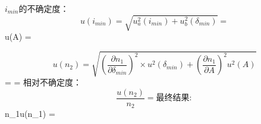${i}_{min}$的不确定度：
$$u({i}_{min}) = \sqrt{u^2_a({i}_{min})+u^2_b({\delta}_{min})} = %

$$u(A) = %

$$u(n_2) = \sqrt{(\displaystyle\frac{{\partial}n_1}{{\partial}{\delta}_{min}})^2{\times}u^2({\delta}_{min})+(\displaystyle\frac{{\partial}n_1}{{\partial}A})^2u^2(A)} %
$$= \displaystyle{}\displaystyle{}\displaystyle{} = %
相对不确定度：
$$\displaystyle\frac{u(n_2)}{n_2} = %

最终结果:
$${n_1}{\pm}u({n_1}) = %